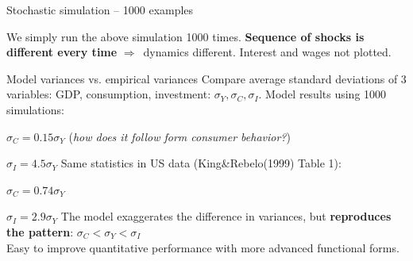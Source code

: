 \documentclass{beamer}
\newenvironment{mynumerate}
{\vfill\enumerate[nolistsep,itemsep=\fill,label=\arabic*.]}
  {\endenumerate}
\newcommand{\rarr}{$\Rightarrow$\ }
\begin{document}
\begin{frame}{Stochastic simulation -- 1000 examples}

  We simply run the above simulation 1000 times. \textbf{Sequence of shocks is different every time} \rarr dynamics different. Interest and wages not plotted.
\begin{center}
\vspace{-5mm}
\begin{figure}[h!]
\end{figure}
\end{center}

\end{frame}

\begin{frame}{Model variances vs. empirical variances}
  Compare average standard deviations of 3 variables: GDP, consumption, investment: $\sigma_Y, \sigma_C, \sigma_I$.
  \vfill 
  Model results using 1000 simulations: 
  \begin{mynumerate}
  \item $\sigma_C = 0.15 \sigma_Y$ (\textit{how does it follow form consumer behavior?})
  \item $\sigma_I = 4.5 \sigma_Y$ 
  \end{mynumerate}
  \vfill
  Same statistics in US data (King\&Rebelo(1999) Table 1):
  \begin{mynumerate}
  \item $\sigma_C = 0.74 \sigma_Y$ 
  \item $\sigma_I = 2.9 \sigma_Y$ 
  \end{mynumerate}
  The model exaggerates the difference in variances, but \textbf{reproduces the pattern}: $\sigma_C < \sigma_Y < \sigma_I$ \\
  Easy to improve quantitative performance with more advanced functional forms.


\end{frame}
\end{document}
